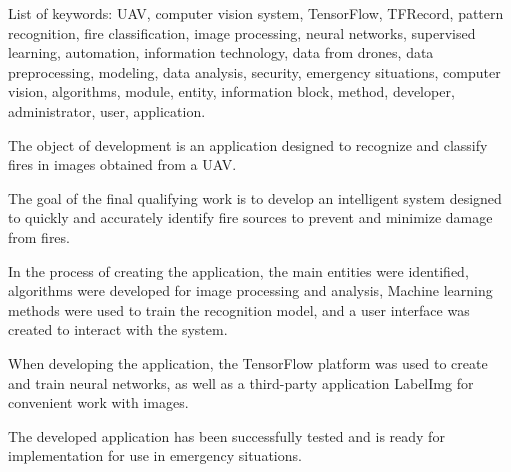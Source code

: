 List of keywords: UAV, computer vision system, TensorFlow, TFRecord, pattern recognition, fire classification, image processing, neural networks, supervised learning, automation, information technology, data from drones, data preprocessing, modeling, data analysis, security, emergency situations, computer vision, algorithms, module, entity, information block, method, developer, administrator, user, application.

The object of development is an application designed to recognize and classify fires in images obtained from a UAV.

The goal of the final qualifying work is to develop an intelligent system designed to quickly and accurately identify fire sources to prevent and minimize damage from fires.

In the process of creating the application, the main entities were identified, algorithms were developed for image processing and analysis, Machine learning methods were used to train the recognition model, and a user interface was created to interact with the system.

When developing the application, the TensorFlow platform was used to create and train neural networks, as well as a third-party application LabelImg for convenient work with images.

The developed application has been successfully tested and is ready for implementation for use in emergency situations.
